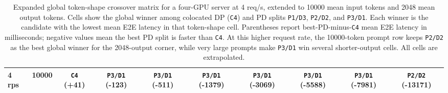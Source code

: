 \begin{table}[t]
{\begin{tabular}{llcccccccc}
4 rps & 10000 & \texttt{C4} (+41) & \texttt{P3/D1} (-123) & \texttt{P3/D1} (-511) & \texttt{P3/D1} (-1379) & \texttt{P3/D1} (-3069) & \texttt{P3/D1} (-5588) & \texttt{P3/D1} (-7981) & \texttt{P2/D2} (-13171) \\
\bottomrule
\end{tabular}
}
\caption{Expanded global token-shape crossover matrix for a four-GPU server at 4 req/s, extended to 10000 mean input tokens and 2048 mean output tokens. Cells show
the global winner among colocated DP (\texttt{C4}) and PD splits
\texttt{P1/D3}, \texttt{P2/D2}, and \texttt{P3/D1}. Each winner is
the candidate with the lowest mean E2E latency in that token-shape cell.
Parentheses report best-PD-minus-\texttt{C4} mean E2E latency in
milliseconds; negative values mean the best PD split is faster than \texttt{C4}.
At this higher request rate, the 10000-token prompt row keeps \texttt{P2/D2}
as the best global winner for the 2048-output corner, while very large prompts
make \texttt{P3/D1} win several shorter-output cells. All cells are extrapolated.}
\label{tab:global-crossover-matrix-rps4}
\end{table}
